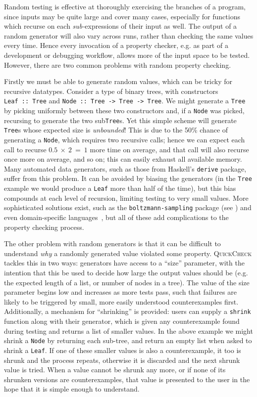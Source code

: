 Random testing is effective at thoroughly exercising the branches of a program,
since inputs may be quite large and cover many cases, especially for functions
which recurse on each \emph{sub-}expressions of their input as well. The output
of a random generator will also vary across runs, rather than checking the same
values every time. Hence every invocation of a property checker, e.g. as part of
a development or debugging workflow, allows more of the input space to be
tested. However, there are two common problems with random property checking.

Firstly we must be able to generate random values, which can be tricky for
recursive datatypes. Consider a type of binary trees, with constructors
\texttt{Leaf~::~Tree} and \texttt{Node~::~Tree~->~Tree~->~Tree}. We might
generate a \texttt{Tree} by picking uniformly between these two constructors
and, if a \texttt{Node} was picked, recursing to generate the two
sub\texttt{Tree}s. Yet this simple scheme will generate \texttt{Tree}s whose
expected size is \emph{unbounded}! This is due to the 50\% chance of generating
a \texttt{Node}, which requires two recursive calls; hence we can expect each
call to recurse $0.5~\times~2~=~1$ more time on average, and that call will also
recurse once more on average, and so on; this can easily exhaust all available
memory. Many automated data generators, such as those from Haskell's
\texttt{derive} package, suffer from this problem. It can be avoided by biasing
the generators (in the \texttt{Tree} example we would produce a \texttt{Leaf}
more than half of the time), but this bias compounds at each level of recursion,
limiting testing to very small values. More sophisticated solutions exist, such
as the \texttt{boltzmann-sampling} package (see \cite{duchon2004boltzmann}) and
even domain-specific languages~\cite{lampropoulos2017beginner}, but all of these
add complications to the property checking process.

The other problem with random generators is that it can be difficult to
understand \emph{why} a randomly generated value violated some property.
\textsc{QuickCheck} tackles this in two ways: generators have access to a
``size'' parameter, with the intention that this be used to decide how large the
output values should be (e.g. the expected length of a list, or number of nodes
in a tree). The value of the size parameter begins low and increases as more
tests pass, such that failures are likely to be triggered by small, more easily
understood counterexamples first. Additionally, a mechanism for ``shrinking'' is
provided: users can supply a \texttt{shrink} function along with their
generator, which is given any counterexample found during testing and returns a
list of smaller values. In the above example we might shrink a \texttt{Node} by
returning each sub-tree, and return an empty list when asked to shrink a
\texttt{Leaf}. If one of these smaller values is also a counterexample, it too
is shrunk and the process repeats, otherwise it is discarded and the next shrunk
value is tried. When a value cannot be shrunk any more, or if none of its
shrunken versions are counterexamples, that value is presented to the user in
the hope that it is simple enough to understand.


